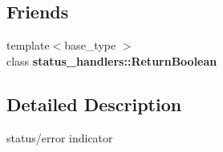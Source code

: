 \subsection*{Friends}
\begin{DoxyCompactItemize}
\item 
\mbox{\label{classwarpcore_1_1Status_a8fe69da064adda8c1335cf17db337f85}} 
{\footnotesize template$<$base\+\_\+type $>$ }\\class {\bfseries status\+\_\+handlers\+::\+Return\+Boolean}
\end{DoxyCompactItemize}


\subsection{Detailed Description}
status/error indicator 